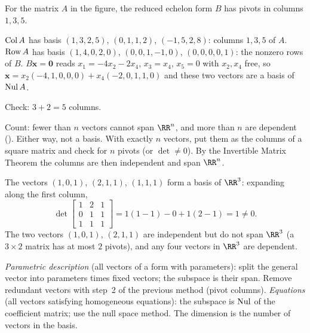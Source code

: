 \documentclass[10pt]{scrartcl}
\newcommand{\vv}[1]{\mathbf{#1}}
\begin{document}
\begin{example*}
For the matrix $A$ in the figure, the reduced echelon form $B$ has pivots in columns $1,3,5$.
\begin{itemize}
  \ii $\operatorname{Col} A$ has basis $(1,3,2,5)$, $(0,1,1,2)$, $(-1,5,2,8)$: columns $1,3,5$ of $A$.
  \ii $\operatorname{Row} A$ has basis $(1,4,0,2,0)$, $(0,0,1,-1,0)$, $(0,0,0,0,1)$: the nonzero rows of $B$.
  \ii $B\vv x=\vv 0$ reads $x_1=-4x_2-2x_4$, $x_3=x_4$, $x_5=0$ with $x_2,x_4$ free, so $\vv x=x_2(-4,1,0,0,0)+x_4(-2,0,1,1,0)$ and these two vectors are a basis of $\operatorname{Nul} A$.
\end{itemize}
Check: $3+2=5$ columns.
\end{example*}

\begin{steps}
  \ii Count: fewer than $n$ vectors cannot span $\RR^n$, and more than $n$ are dependent (). Either way, not a basis.
  \ii With exactly $n$ vectors, put them as the columns of a square matrix and check for $n$ pivots (or $\det\ne0$). By the Invertible Matrix Theorem the columns are then independent and span $\RR^n$.
\end{steps}

\begin{example*}
The vectors $(1,0,1)$, $(2,1,1)$, $(1,1,1)$ form a basis of $\RR^3$: expanding along the first column,
\[
  \det\begin{bmatrix}1&2&1\\0&1&1\\1&1&1\end{bmatrix}=1(1-1)-0+1(2-1)=1\ne0.
\]
The two vectors $(1,0,1)$, $(2,1,1)$ are independent but do not span $\RR^3$ (a $3\times2$ matrix has at most $2$ pivots), and any four vectors in $\RR^3$ are dependent.
\end{example*}

\begin{steps}
  \ii \emph{Parametric description} (all vectors of a form with parameters): split the general vector into parameters times fixed vectors; the subspace is their span. Remove redundant vectors with step~2 of the previous method (pivot columns).
  \ii \emph{Equations} (all vectors satisfying homogeneous equations): the subspace is $\operatorname{Nul}$ of the coefficient matrix; use the null space method.
  \ii The dimension is the number of vectors in the basis.
\end{steps}
\end{document}
